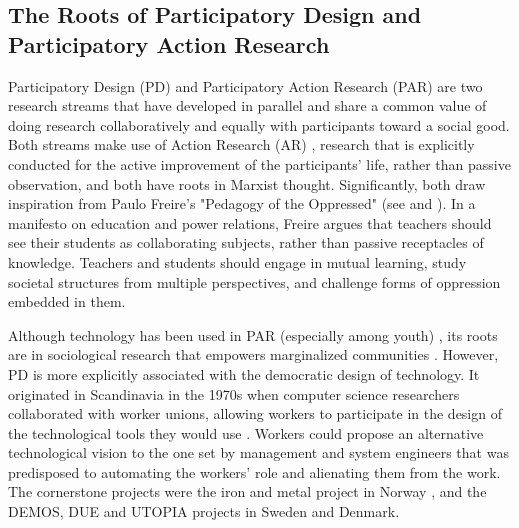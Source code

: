 \documentclass[dissertation,math,vertlayout,pdfa,colorlinks,nologo]{aaltoseries}
\begin{document}
\subsection{The Roots of Participatory Design and Participatory Action Research}
Participatory Design (PD) \cite{disalvoCommunitiesParticipatoryDesign2012} and Participatory Action Research (PAR) \cite{falsbordaAccionConocimientoComo1991} are two research streams that have developed in parallel and share a common value of doing research collaboratively and equally with participants toward a social good. Both streams make use of Action Research (AR) \cite{lewinActionResearchMinority1946}, research that is explicitly conducted for the active improvement of the participants' life, rather than passive observation, and both have roots in Marxist thought. Significantly, both draw inspiration from Paulo Freire's "Pedagogy of the Oppressed" \cite{freirePedagogyOppressed2000} (see \cite{falsbordaAccionConocimientoComo1991} and \cite{ehnWorkorientedDesignComputer1988}). In a manifesto on education and power relations, Freire argues that teachers should see their students as collaborating subjects, rather than passive receptacles of knowledge. Teachers and students should engage in mutual learning, study societal structures from multiple perspectives, and challenge forms of oppression embedded in them.

Although technology has been used in PAR (especially among youth) \cite{gibbsUsingTechnologyScale2020}, its roots are in sociological research that empowers marginalized communities \cite{falsbordaAccionConocimientoComo1991,whyteParticipatoryActionResearch1991}. However, PD is more explicitly associated with the democratic design of technology. It originated in Scandinavia in the 1970s when computer science researchers collaborated with worker unions, allowing workers to participate in the design of the technological tools they would use \cite{kensingHeritageHavingSay2012}. Workers could propose an alternative technological vision to the one set by management and system engineers that was predisposed to automating the workers' role and alienating them from the work. The cornerstone projects were the iron and metal project in Norway \cite{nygaardTradeUnionsNew1975}, and the DEMOS\cite{ehnLocalUnionInfluence1983}, DUE \cite{kyngSystemsDevelopmentTrade1982} and UTOPIA \cite{ehnToolPerspectiveDesign1986} projects in Sweden and Denmark.
\end{document}

